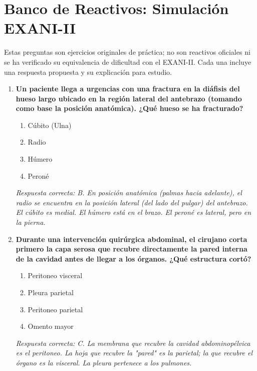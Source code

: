 \newpage
\section{Banco de Reactivos: Simulación EXANI-II}
Estas preguntas son ejercicios originales de práctica; no son reactivos oficiales ni se ha verificado su equivalencia de dificultad con el EXANI-II. Cada una incluye una respuesta propuesta y su explicación para estudio.

\begin{enumerate}[label=\textbf{\arabic*.}]
    \item \textbf{Un paciente llega a urgencias con una fractura en la diáfisis del hueso largo ubicado en la región lateral del antebrazo (tomando como base la posición anatómica). ¿Qué hueso se ha fracturado?}
    \begin{enumerate}
        \item[A)] Cúbito (Ulna)
        \item[B)] Radio
        \item[C)] Húmero
        \item[D)] Peroné
    \end{enumerate}
    \textit{Respuesta correcta: B. En posición anatómica (palmas hacia adelante), el radio se encuentra en la posición lateral (del lado del pulgar) del antebrazo. El cúbito es medial. El húmero está en el brazo. El peroné es lateral, pero en la pierna.}

    \item \textbf{Durante una intervención quirúrgica abdominal, el cirujano corta primero la capa serosa que recubre directamente la pared interna de la cavidad antes de llegar a los órganos. ¿Qué estructura cortó?}
    \begin{enumerate}
        \item[A)] Peritoneo visceral
        \item[B)] Pleura parietal
        \item[C)] Peritoneo parietal
        \item[D)] Omento mayor
    \end{enumerate}
    \textit{Respuesta correcta: C. La membrana que recubre la cavidad abdominopélvica es el peritoneo. La hoja que recubre la "pared" es la parietal; la que recubre el órgano es la visceral. La pleura pertenece a los pulmones.}


\end{enumerate}
